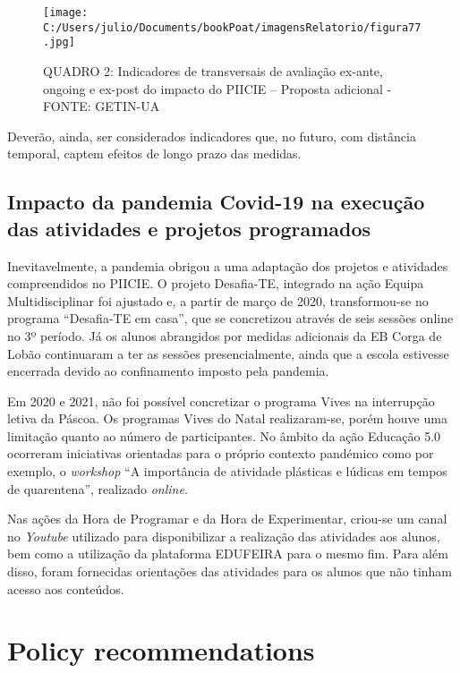 \documentclass[
]{book}
\begin{document}
\begin{figure}
\centering
\texttt{[image: C:/Users/julio/Documents/bookPoat/imagensRelatorio/figura77.jpg]}
\caption{QUADRO 2: Indicadores de transversais de avaliação ex-ante, ongoing e ex-post do impacto do PIICIE -- Proposta adicional - FONTE: GETIN-UA}
\end{figure}

Deverão, ainda, ser considerados indicadores que, no futuro, com distância temporal, captem efeitos de longo prazo das medidas.

\hypertarget{impacto-da-pandemia-covid-19-na-execuuxe7uxe3o-das-atividades-e-projetos-programados}{%
\section{\texorpdfstring{\textbf{Impacto da pandemia Covid-19 na execução das atividades e projetos programados}}{Impacto da pandemia Covid-19 na execução das atividades e projetos programados}}\label{impacto-da-pandemia-covid-19-na-execuuxe7uxe3o-das-atividades-e-projetos-programados}}

Inevitavelmente, a pandemia obrigou a uma adaptação dos projetos e atividades compreendidos no PIICIE. O projeto Desafia-TE, integrado na ação Equipa Multidisciplinar foi ajustado e, a partir de março de 2020, transformou-se no programa ``Desafia-TE em casa'', que se concretizou através de seis sessões online no 3º período. Já os alunos abrangidos por medidas adicionais da EB Corga de Lobão continuaram a ter as sessões presencialmente, ainda que a escola estivesse encerrada devido ao confinamento imposto pela pandemia.

Em 2020 e 2021, não foi possível concretizar o programa Vives na interrupção letiva da Páscoa. Os programas Vives do Natal realizaram-se, porém houve uma limitação quanto ao número de participantes. No âmbito da ação Educação 5.0 ocorreram iniciativas orientadas para o próprio contexto pandémico como por exemplo, o \emph{workshop} ``A importância de atividade plásticas e lúdicas em tempos de quarentena'', realizado \emph{online}.

Nas ações da Hora de Programar e da Hora de Experimentar, criou-se um canal no \emph{Youtube} utilizado para disponibilizar a realização das atividades aos alunos, bem como a utilização da plataforma EDUFEIRA para o mesmo fim. Para além disso, foram fornecidas orientações das atividades para os alunos que não tinham acesso aos conteúdos.

\hypertarget{policy-recommendations}{%
\chapter{\texorpdfstring{\textbf{Policy recommendations}}{Policy recommendations}}\label{policy-recommendations}}
\end{document}
